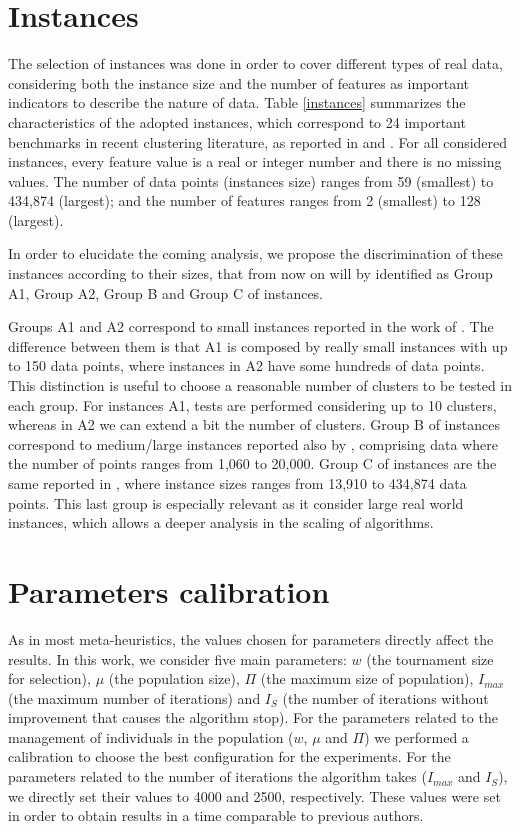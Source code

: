 \section{Instances}
\label{sec:instances}
The selection of instances was done in order to cover different types of real data, considering both the instance size and the number of features as important indicators to describe the nature of data. Table \ref{instances} summarizes the characteristics of the adopted instances, which correspond to 24 important benchmarks in recent clustering literature, as reported in \cite{Ordin2014} and \cite{Bagirov2016}. For all considered instances, every feature value is a real or integer number and there is no missing values. The number of data points (instances size) ranges from 59 (smallest) to 434,874 (largest); and the number of features ranges from 2 (smallest) to 128 (largest).

In order to elucidate the coming analysis, we propose the discrimination of these instances according to their sizes, that from now on will by identified as Group A1, Group A2, Group B and Group C of instances.

Groups A1 and A2 correspond to small instances reported in the work of \cite{Ordin2014}. The difference between them is that A1 is composed by really small instances with up to 150 data points, where instances in A2 have some hundreds of data points. This distinction is useful to choose a reasonable number of clusters to be tested in each group. For instances A1, tests are performed considering up to 10 clusters, whereas in A2 we can extend a bit the number of clusters. Group B of instances correspond to medium/large instances reported also by \cite{Ordin2014}, comprising data where the number of points ranges from 1,060 to 20,000. Group C of instances are the same reported in \cite{Bagirov2016}, where instance sizes ranges from 13,910 to 434,874 data points. This last group is especially relevant as it consider large real world instances, which allows a deeper analysis in the scaling of algorithms.



\section{Parameters calibration}
\label{sec:calibration}
As in most meta-heuristics, the values chosen for parameters directly affect the results. In this work, we consider five main parameters: $w$ (the tournament size for selection), $\mu$ (the population size), $\Pi$ (the maximum size of population), $I_{max}$ (the maximum number of iterations) and $I_S$ (the number of iterations without improvement that causes the algorithm stop). For the parameters related to the management of individuals in the population ($w$, $\mu$ and $\Pi$) we performed a calibration to choose the best configuration for the experiments. For the parameters related to the number of iterations the algorithm takes ($I_{max}$ and $I_S$), we directly set their values to 4000 and 2500, respectively. These values were set in order to obtain results in a time comparable to previous authors.

